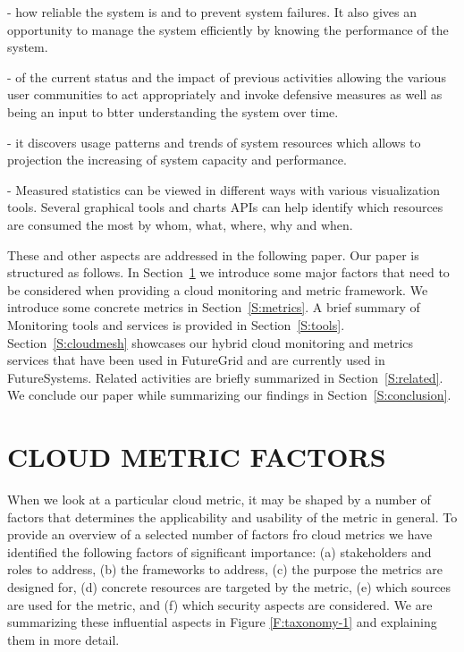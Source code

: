 \documentclass{sig-alternate-05-2015}
\begin{document}
\begin{description}
\setlength\itemsep{-2pt}

\item[\it Understanding] - how reliable the system is and to prevent
  system failures. It also gives an opportunity to manage the system
  efficiently by knowing the performance of the system.

\item[\it Getting informed] - of the current status and the impact of
  previous activities allowing the various user communities to act
  appropriately and invoke defensive measures as well as being an
  input to btter understanding the system over time.

\item[\it Estimating future requests] - it discovers usage patterns
  and trends of system resources which allows to projection the
  increasing of system capacity and performance.

\item[\it Reporting] - Measured statistics can be viewed in different
  ways with various visualization tools. Several graphical tools and
  charts APIs can help identify which resources are consumed the most
  by whom, what, where, why and when.

\end{description}

These and other aspects are addressed in the following paper. Our
paper is structured as follows. In Section~\ref{S:factors} we
introduce some major factors that need to be considered when providing
a cloud monitoring and metric framework. We introduce some concrete
metrics in Section~\ref{S:metrics}.  A brief summary of Monitoring
tools and services is provided in Section~\ref{S:tools}.
Section~\ref{S:cloudmesh} showcases our hybrid cloud monitoring and
metrics services that have been used in FutureGrid and are currently
used in FutureSystems. Related activities are briefly summarized in
Section~\ref{S:related}.  We conclude our paper while summarizing our
findings in Section~\ref{S:conclusion}.

\section{CLOUD METRIC FACTORS} \label {S:factors}

When we look at a particular cloud metric, it may be shaped by a
number of factors that determines the applicability and usability of
the metric in general. To provide an overview of a selected number of
factors fro cloud metrics we have identified the following factors of
significant importance: (a) stakeholders and roles to address, (b) the
frameworks to address, (c) the purpose the metrics are designed for,
(d) concrete resources are targeted by the metric, (e) which sources
are used for the metric, and (f) which security aspects are
considered. We are summarizing these influential aspects in Figure
\ref{F:taxonomy-1} and explaining them in more detail.
\end{document}

